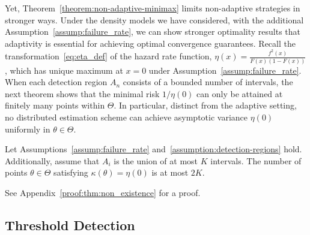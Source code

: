 Yet, Theorem~\ref{theorem:non-adaptive-minimax}
limits non-adaptive strategies in stronger ways.
Under the density models we have considered, with the additional
Assumption~\ref{assump:failure_rate}, we can show stronger
optimality results that adaptivity is essential for achieving
optimal convergence guarantees.
Recall the transformation~\eqref{eq:eta_def} of the
hazard rate function, $\eta(x) = \frac{f^2(x)}{F(x)(1 - F(x))}$, which
has unique maximum at $x = 0$ under Assumption~\ref{assump:failure_rate}.
When each detection region $A_n$ consists of a bounded number
of intervals, the next theorem shows that
the minimal risk $1/\eta(0)$ can
only be attained at finitely many points within $\Theta$.
In particular, distinct from the adaptive setting, no distributed
estimation scheme can achieve asymptotic variance $\eta(0)$
uniformly in $\theta \in \Theta$.

\begin{thm} \label{thm:non_existence}
  Let Assumptions~\ref{assump:failure_rate}
  and~\ref{assumption:detection-regions} hold.
  Additionally, assume that $A_i$ is the union of at most $K$
  intervals. The number of points $\theta \in \Theta$ satisfying
  $\kappa(\theta) = \eta(0)$ is at most $2K$.
\end{thm}
\noindent
See Appendix~\ref{proof:thm:non_existence} for a proof.



\subsection{Threshold Detection}
\label{subsec:threshold}

